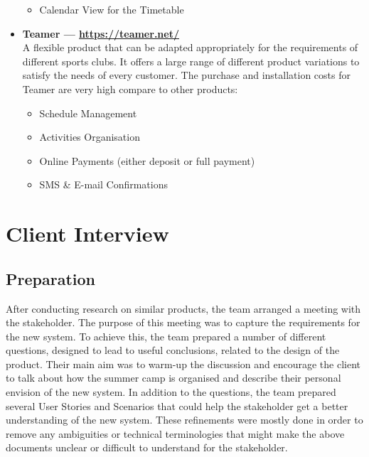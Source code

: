 \documentclass{l3proj}
\begin{document}
\begin{itemize}
\begin{itemize}
	\item Calendar View for the Timetable
		\end{itemize}
\item \textbf{Teamer --- \url{https://teamer.net/}}\\
A flexible product that can be adapted appropriately for the requirements of different sports clubs. It offers a large range of different product variations to satisfy the needs of every customer. The purchase and installation costs for Teamer are very high compare to other products:
		\begin{itemize}
	\item Schedule Management
	\item Activities Organisation
	\item Online Payments (either deposit or full payment)
	\item SMS \& E-mail Confirmations
		\end{itemize}
\end{itemize}


\section{Client Interview}

\subsection{Preparation}
\par 
After conducting research on similar products, the team arranged a meeting with the stakeholder.  The purpose of this meeting was to capture the requirements for the new system. To achieve this, the team  prepared a number of different questions, designed to lead to useful conclusions, related to the design of the product. Their main aim was to warm-up the discussion and encourage the client to talk about how the summer camp is organised and describe their personal envision of the new system. In addition to the questions, the team prepared several User Stories and Scenarios that could help the stakeholder get a better understanding of the new system. These refinements were mostly done in order to remove any ambiguities or technical terminologies that might make the above documents unclear or difficult to understand for the stakeholder.

\end{document}
